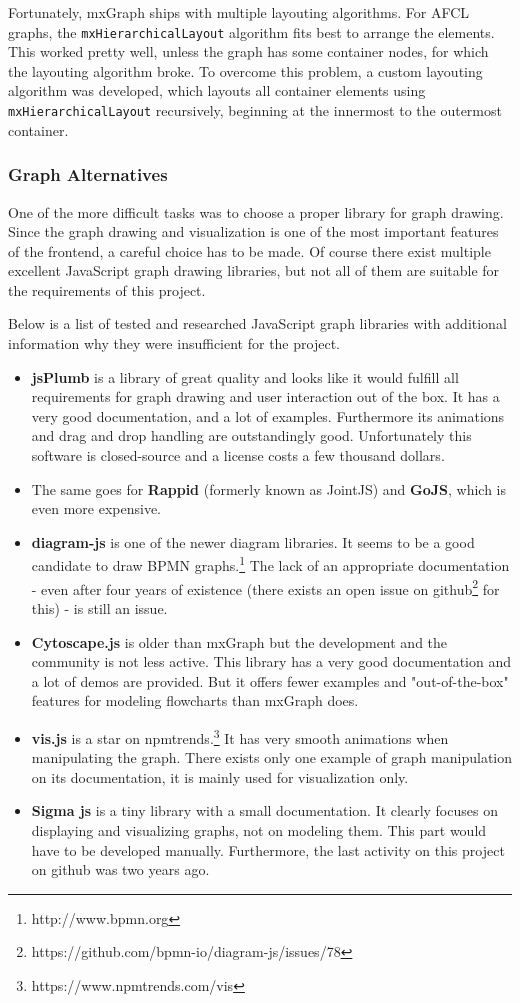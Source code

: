 \documentclass[a4paper,top=25mm,bottom=25mm,12pt,pdftex,halfparskip,twoside,bibtotoc,numbers=noenddot]{scrbook}
\begin{document}
Fortunately, mxGraph ships with multiple layouting algorithms.
For AFCL graphs, the \texttt{mxHierarchicalLayout} algorithm fits best to arrange the elements. This worked pretty well, unless the graph has some container nodes, for which the layouting algorithm broke.
To overcome this problem, a custom layouting algorithm was developed, which layouts all container elements using \texttt{mxHierarchicalLayout} recursively, beginning at the innermost to the outermost container.

\label{sec:graph-alternatives}
\subsubsection{Graph Alternatives}

One of the more difficult tasks was to choose a proper library for graph drawing. Since the graph drawing and visualization is one of the most important features of the frontend, a careful choice has to be made. Of course there exist multiple excellent JavaScript graph drawing libraries, but not all of them are suitable for the requirements of this project.

Below is a list of tested and researched JavaScript graph libraries with additional information why they were insufficient for the project.
\begin{itemize}
	\item \textbf{jsPlumb} is a library of great quality and looks like it would fulfill all  requirements for graph drawing and user interaction out of the box. It has a very good documentation, and a lot of examples. Furthermore its animations and drag and drop handling are outstandingly good. Unfortunately this software is closed-source and a license costs a few thousand dollars.
	\item The same goes for \textbf{Rappid} (formerly known as JointJS) and \textbf{GoJS}, which is even more expensive.
	\item \textbf{diagram-js} is one of the newer diagram libraries. It seems to be a good candidate to draw BPMN graphs.\footnote{http://www.bpmn.org} The lack of an appropriate documentation - even after four years of existence (there exists an open issue on github\footnote{https://github.com/bpmn-io/diagram-js/issues/78} for this) - is still an issue.
	\item \textbf{Cytoscape.js} is older than mxGraph but the development and the community is not less active. This library has a very good documentation and a lot of demos are provided. But it offers fewer examples and "out-of-the-box" features for modeling flowcharts than mxGraph does.
	\item \textbf{vis.js} is a star on npmtrends.\footnote{https://www.npmtrends.com/vis}  It has very smooth animations when manipulating the graph. There exists only one example of graph manipulation on its documentation, it is mainly used for visualization only.
	\item \textbf{Sigma js} is a tiny library with a small documentation. It clearly focuses on displaying and visualizing graphs, not on modeling them. This part would have to be developed manually. Furthermore, the last activity on this project on github was two years ago.
\end{itemize}
\end{document}
